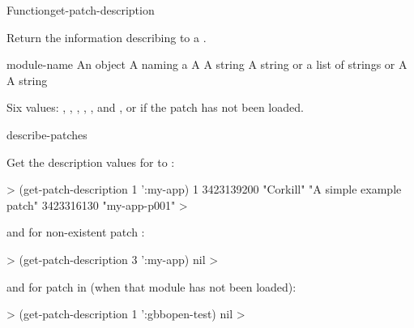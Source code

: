 \documentclass[10pt,twoside,english,pdftex]{article}
\begin{document}
\begin{functiondoc}{Function}{get-patch-description}%
  {
    }
%

\fnsyntax 

\fnpurpose Return the information describing   to a
.

\fnpackage {}

\fnmodule {}

\fnargs
\begin{args}{module-name}
\arg[id] An object
 A  naming a 
\arg[date] A 
\arg[author] A string
\arg[description] A string or a list of strings or \nil
{} A 
 A string
\end{args}

\fnreturns Six values: , , ,
, , and
, or \nil{} if the patch has not been loaded.

\fnerrors
\modulenotdefined

\begin{alsos}{describe-patches}
\also[patch]
\end{alsos}

\fnexamples
%
Get the description values for   to 
:
%
\W\supp
\begin{example}
  > (get-patch-description 1 ':my-app)
  1
  3423139200
  "Corkill"
  "A simple example patch"
  3423316130
  "my-app-p001"
  >
\end{example}
%
and for non-existent patch :
%
\W\supp\notpretop
\begin{example}
  > (get-patch-description 3 ':my-app)
  nil
  >
\end{example}
%
and for patch  in   (when
that module has not been loaded):
%
\W\supp\notpretop
\begin{example}
  > (get-patch-description 1 ':gbbopen-test)
  nil
  >
\end{example}

\end{functiondoc}
\end{document}
